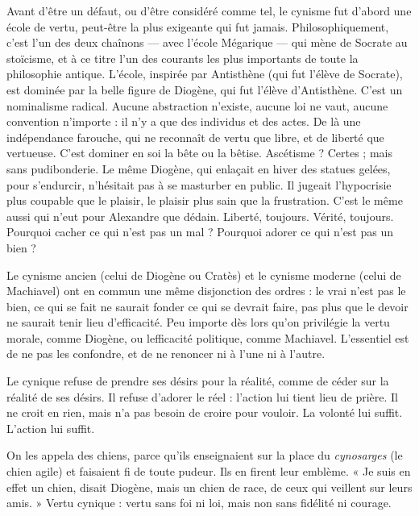 Avant d’être un défaut, ou d’être considéré comme tel, le cynisme fut
d’abord une école de vertu, peut-être la plus exigeante qui fut jamais.
Philosophiquement, c’est l’un des deux chaînons — avec l’école Mégarique — qui mène
de Socrate au stoïcisme, et à ce titre l’un des courants les plus importants de
toute la philosophie antique. L'école, inspirée par Antisthène (qui fut l'élève de
Socrate), est dominée par la belle figure de Diogène, qui fut l’élève d’Antisthène.
C’est un nominalisme radical. Aucune abstraction n’existe, aucune loi
ne vaut, aucune convention n'importe : il n’y a que des individus et des actes.
De là une indépendance farouche, qui ne reconnaît de vertu que libre, et de
liberté que vertueuse. C’est dominer en soi la bête ou la bêtise. Ascétisme ?
Certes ; mais sans pudibonderie. Le même Diogène, qui enlaçait en hiver des
statues gelées, pour s’endurcir, n’hésitait pas à se masturber en public. Il jugeait
l’hypocrisie plus coupable que le plaisir, le plaisir plus sain que la frustration.
C’est le même aussi qui n’eut pour Alexandre que dédain. Liberté, toujours.
Vérité, toujours. Pourquoi cacher ce qui n’est pas un mal ? Pourquoi adorer ce
qui n’est pas un bien ?

Le cynisme ancien (celui de Diogène ou Cratès) et le cynisme moderne
(celui de Machiavel) ont en commun une même disjonction des ordres : le vrai
n’est pas le bien, ce qui se fait ne saurait fonder ce qui se devrait faire, pas plus
que le devoir ne saurait tenir lieu d’efficacité. Peu importe dès lors qu’on privilégie
la vertu morale, comme Diogène, ou lefficacité politique, comme
Machiavel. L'essentiel est de ne pas les confondre, et de ne renoncer ni à l’une
ni à l’autre.

Le cynique refuse de prendre ses désirs pour la réalité, comme de céder sur
la réalité de ses désirs. Il refuse d’adorer le réel : l’action lui tient lieu de prière.
Il ne croit en rien, mais n’a pas besoin de croire pour vouloir. La volonté lui
suffit. L'action lui suffit.

On les appela des chiens, parce qu’ils enseignaient sur la place du {\it cynosarges}
(le chien agile) et faisaient fi de toute pudeur. Ils en firent leur emblème. « Je
suis en effet un chien, disait Diogène, mais un chien de race, de ceux qui
veillent sur leurs amis. » Vertu cynique : vertu sans foi ni loi, mais non sans
fidélité ni courage.


